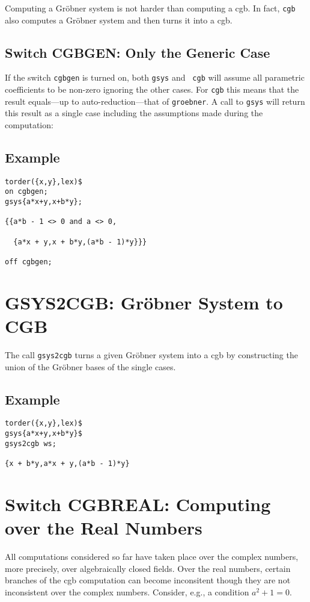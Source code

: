 Computing a Gr\"obner system is not harder than computing a {\sc cgb}.
In fact, {\tt cgb} also computes a Gr\"obner system and then turns it
into a {\sc cgb}.

\subsection{Switch CGBGEN: Only the Generic Case}
If the switch {\tt cgbgen} is turned on, both {\tt gsys} and {\tt
cgb} will assume all parametric coefficients to be non-zero ignoring
the other cases. For {\tt cgb} this means that the result equals---up
to auto-reduction---that of {\tt groebner}. A call to {\tt gsys} will
return this result as a single case including the assumptions made
during the computation:
%
\subsection*{Example}
\begin{verbatim}
torder({x,y},lex)$
on cgbgen;
gsys{a*x+y,x+b*y};

{{a*b - 1 <> 0 and a <> 0,

  {a*x + y,x + b*y,(a*b - 1)*y}}}

off cgbgen;
\end{verbatim}
%
\section{GSYS2CGB: Gr\"obner System to CGB}
The call {\tt gsys2cgb} turns a given Gr\"obner system into a {\sc
cgb} by constructing the union of the Gr\"obner bases of the single
cases.
%
\subsection*{Example}
\begin{verbatim}
torder({x,y},lex)$
gsys{a*x+y,x+b*y}$
gsys2cgb ws;

{x + b*y,a*x + y,(a*b - 1)*y}
\end{verbatim}
%
\section{Switch CGBREAL: Computing over the Real Numbers}\label{cgbreal}
All computations considered so far have taken place over the complex
numbers, more precisely, over algebraically closed fields. Over the
real numbers, certain branches of the {\sc cgb} computation can become
inconsitent though they are not inconsistent over the complex numbers.
Consider, e.g., a condition $a^2+1=0$.

